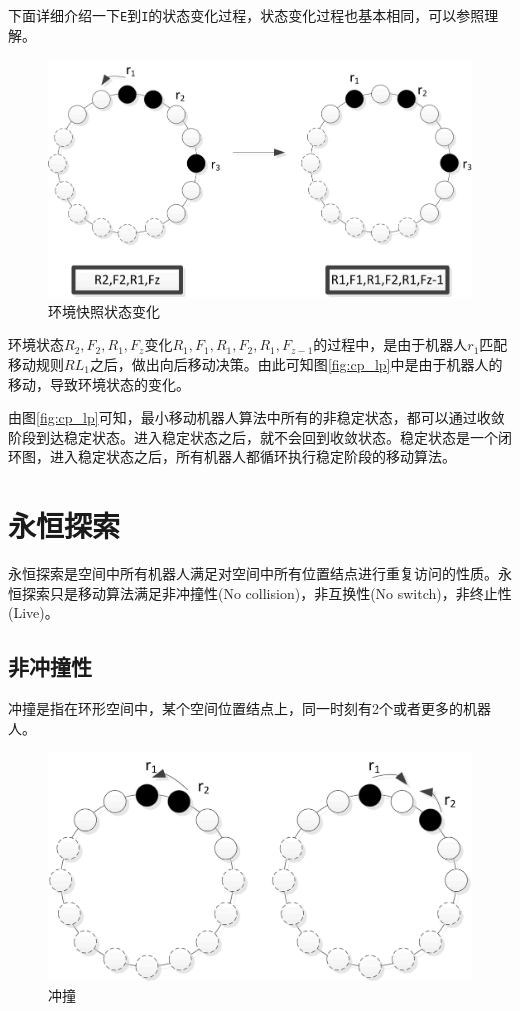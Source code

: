 下面详细介绍一下\verb|E|到\verb|I|的状态变化过程，状态变化过程也基本相同，可以参照理解。

\begin{figure}[!hbt]
	\centering
	\includegraphics[width=5 in]{fig/stateexchange.png}
	\caption{环境快照状态变化}
	\label{fig:stateexchange}
\end{figure}

环境状态$R_2,F_2,R_1,F_z$变化$R_1,F_1,R_1,F_2,R_1,F_{z-1}$的过程中，是由于机器人$r_1$匹配移动规则$RL_1$之后，做出向后移动决策。由此可知图\ref{fig:cp_lp}中是由于机器人的移动，导致环境状态的变化。

由图\ref{fig:cp_lp}可知，最小移动机器人算法中所有的非稳定状态，都可以通过收敛阶段到达稳定状态。进入稳定状态之后，就不会回到收敛状态。稳定状态是一个闭环图，进入稳定状态之后，所有机器人都循环执行稳定阶段的移动算法。

\section{永恒探索}
永恒探索是空间中所有机器人满足对空间中所有位置结点进行重复访问的性质。永恒探索只是移动算法满足非冲撞性(No collision)，非互换性(No switch)，非终止性(Live)。

\subsection{非冲撞性}
冲撞是指在环形空间中，某个空间位置结点上，同一时刻有2个或者更多的机器人。

\begin{figure}[!hbt]
	\centering
	\includegraphics[width=5 in]{fig/collision.png}
	\caption{冲撞}
	\label{fig:collision}
\end{figure}

